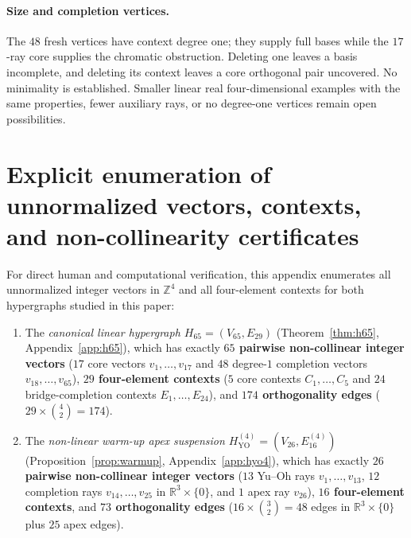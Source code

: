 \documentclass[
  aps,
  pra,
  reprint,
  superscriptaddress,
  amsmath,
  amssymb,
  nofootinbib,
  floatfix
]{revtex4-2}
\theoremstyle{definition}
\theoremstyle{remark}
\newcommand{\R}{\mathbb{R}}
\newcommand{\YO}{\mathrm{YO}}
\begin{document}
\paragraph*{Size and completion vertices.}
The $48$ fresh vertices have context degree one; they supply full bases while the $17$-ray core supplies the chromatic obstruction. Deleting one leaves a basis incomplete, and deleting its context leaves a core orthogonal pair uncovered. No minimality is established. Smaller linear real four-dimensional examples with the same properties, fewer auxiliary rays, or no degree-one vertices remain open possibilities.

\appendix

\section{Explicit enumeration of unnormalized vectors, contexts, and non-collinearity certificates}

For direct human and computational verification, this appendix enumerates all unnormalized integer vectors in $\mathbb{Z}^4$ and all four-element contexts for both hypergraphs studied in this paper:
\begin{enumerate}
\item The \emph{canonical linear hypergraph $H_{65}=(V_{65},E_{29})$} (Theorem~\ref{thm:h65}, Appendix~\ref{app:h65}), which has exactly \textbf{$65$ pairwise non-collinear integer vectors} ($17$ core vectors $v_1,\ldots,v_{17}$ and $48$ degree-$1$ completion vectors $v_{18},\ldots,v_{65}$), \textbf{$29$ four-element contexts} ($5$ core contexts $C_1,\ldots,C_5$ and $24$ bridge-completion contexts $E_1,\ldots,E_{24}$), and \textbf{$174$ orthogonality edges} ($29\times\binom{4}{2}=174$).
\item The \emph{non-linear warm-up apex suspension $H_{\YO}^{(4)}=(V_{26},E_{16}^{(4)})$} (Proposition~\ref{prop:warmup}, Appendix~\ref{app:hyo4}), which has exactly \textbf{$26$ pairwise non-collinear integer vectors} ($13$ Yu--Oh rays $v_1,\ldots,v_{13}$, $12$ completion rays $v_{14},\ldots,v_{25}$ in $\R^3\times\{0\}$, and $1$ apex ray $v_{26}$), \textbf{$16$ four-element contexts}, and \textbf{$73$ orthogonality edges} ($16\times\binom{3}{2}=48$ edges in $\R^3\times\{0\}$ plus $25$ apex edges).
\end{enumerate}
\end{document}
